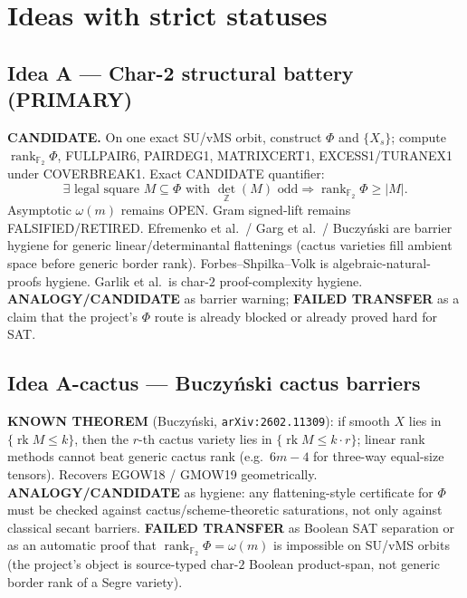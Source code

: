\documentclass[11pt]{article}
\begin{document}
\section*{Ideas with strict statuses}
\subsection*{Idea A --- Char-2 structural battery (PRIMARY)}
\textbf{CANDIDATE.} On one exact SU/vMS orbit, construct $\Phi$ and $\{X_s\}$;
compute $\operatorname{rank}_{\mathbb F_2}\Phi$, FULLPAIR6, PAIRDEG1, MATRIXCERT1,
EXCESS1/TURANEX1 under COVERBREAK1. Exact CANDIDATE quantifier:
\[
\exists\text{ legal square }M\subseteq\Phi\text{ with }\det_{\mathbb Z}(M)\text{ odd}
\Rightarrow\operatorname{rank}_{\mathbb F_2}\Phi\ge|M|.
\]
Asymptotic $\omega(m)$ remains OPEN. Gram signed-lift remains FALSIFIED/RETIRED.
Efremenko et al.\ / Garg et al.\ / Buczy\'nski are barrier hygiene for generic
linear/determinantal flattenings (cactus varieties fill ambient space before
generic border rank). Forbes--Shpilka--Volk is algebraic-natural-proofs hygiene.
Garlik et al.\ is char-$2$ proof-complexity hygiene.
\textbf{ANALOGY/CANDIDATE} as barrier warning; \textbf{FAILED TRANSFER} as a claim
that the project's $\Phi$ route is already blocked or already proved hard for SAT.

\subsection*{Idea A-cactus --- Buczy\'nski cactus barriers}
\textbf{KNOWN THEOREM} (Buczy\'nski, \texttt{arXiv:2602.11309}): if smooth $X$
lies in $\{\operatorname{rk} M\le k\}$, then the $r$-th cactus variety lies in
$\{\operatorname{rk} M\le k\cdot r\}$; linear rank methods cannot beat generic
cactus rank (e.g.\ $6m-4$ for three-way equal-size tensors). Recovers EGOW18 /
GMOW19 geometrically.
\textbf{ANALOGY/CANDIDATE} as hygiene: any flattening-style certificate for
$\Phi$ must be checked against cactus/scheme-theoretic saturations, not only
against classical secant barriers.
\textbf{FAILED TRANSFER} as Boolean SAT separation or as an automatic proof that
$\operatorname{rank}_{\mathbb F_2}\Phi=\omega(m)$ is impossible on SU/vMS orbits
(the project's object is source-typed char-$2$ Boolean product-span, not
generic border rank of a Segre variety).
\end{document}
